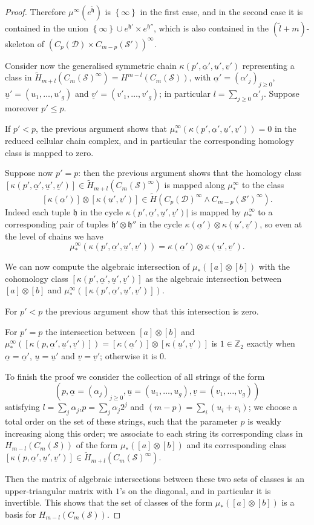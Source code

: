 \documentclass{amsart}
\theoremstyle{plain}
\theoremstyle{definition}
\newcommand{\D}{\mathcal{D}}
\renewcommand{\S}{\mathcal{S}}
\newcommand{\Z}{\mathbb{Z}}
\newcommand{\cms}{C_m(\S)}
\newcommand{\tup}{\mathfrak{h}}
\newcommand{\tH}{\tilde{H}}
\newcommand{\pa}[1]{\left(#1\right)}
\newcommand{\set}[1]{\left\{#1\right\}}
\newcommand{\uu}{\underline{u}}
\newcommand{\uv}{\underline{v}}
\newcommand{\ualpha}{\underline{\alpha}}
\begin{document}
\begin{proof}
Therefore
$\mu^{\infty}(e^{\tilde{\tup}})$ is $\set{\infty}$ in the first case, and in the second case it
is contained in the union $\set{\infty}\cup e^{\tup'}\times e^{\tup''}$, which is also
contained in the $(\tilde{l}+m)$-skeleton of $\pa{C_p(\D)\times C_{m-p}(\S')}^{\infty}$.

Consider now the generalised symmetric chain $\kappa(p',\ualpha',\uu',\uv')$ representing
a class in $\tH_{m+l}(\cms^{\infty})=H^{m-l}(\cms)$, with $\ualpha'=(\alpha'_j)_{j\geq 0}$,
$\uu'=(u_1,\dots,u'_g)$ and $\uv'=(v'_1,\dots,v'_g)$; in particular $l=\sum_{j\geq 0}\alpha'_j$.
Suppose moreover $p'\leq p$.

If $p'<p$, the previous argument shows that $\mu^{\infty}_*\pa{\kappa(p',\ualpha',\uu',\uv')}=0$
in the reduced cellular chain complex,
and in particular the corresponding homology class is mapped to zero.

Suppose now $p'=p$: then the previous argument shows that
the homology class $[\kappa(p',\ualpha',\uu',\uv')]\in \tH_{m+l}(\cms^{\infty})$
is mapped along $\mu^{\infty}_*$ to the class
\[
[\kappa(\ualpha')]\otimes [\kappa(\uu',\uv')]\in\tH\pa{C_p(\D)^{\infty}\wedge C_{m-p}(\S')^{\infty}}.
\]
Indeed each tuple $\tup$ in the cycle $\kappa(p',\ualpha',\uu',\uv')|$ is mapped by $\mu^{\infty}_*$
to a corresponding pair of tuples $\tup'\otimes\tup''$ in the cycle $\kappa(\ualpha')\otimes \kappa(\uu',\uv')$,
so even at the level of chains we have
\[
\mu^{\infty}_*\pa{\kappa(p',\ualpha',\uu',\uv')}=\kappa(\ualpha')\otimes \kappa(\uu',\uv').
\]

We can now compute the algebraic intersection of $\mu_*([a]\otimes [b])$ with
the cohomology class $[\kappa(p',\ualpha',\uu',\uv')]$ as the algebraic intersection between
$[a]\otimes [b]$ and $\mu^{\infty}_*\pa{[\kappa(p',\ualpha',\uu',\uv')]}$.

For $p'<p$ the previous argument show that this intersection is zero.

For $p'=p$ the intersection between
$[a]\otimes [b]$ and $\mu^{\infty}_*([\kappa(p,\ualpha',\uu',\uv')])=[\kappa(\ualpha')]\otimes [\kappa(\uu',\uv')]$
is $1\in\Z_2$ exactly when $\ualpha=\ualpha'$, $\uu=\uu'$ and $\uv=\uv'$; otherwise it is $0$.

To finish the proof we consider the collection of all strings of the form
\[
\pa{p,\ualpha=(\alpha_j)_{j\geq 0},\uu=(u_1,\dots,u_g),\uv=(v_1,\dots,v_g)}
\]
satisfying $l=\sum_j\alpha_j$,$p=\sum_j \alpha_j2^j$ and $(m-p)=\sum_i(u_i+v_i)$;
we choose a total order on the set of these strings,
such that the parameter $p$ is weakly increasing along this order; we associate
to each string its corresponding class in $H_{m-l}(\cms)$ of the form $\mu_*([a]\otimes [b])$ and its
corresponding class $[\kappa(p,\ualpha',\uu',\uv')]\in\tH_{m+l}(\cms^{\infty})$.

Then the matrix of algebraic intersections between these two sets of
classes is an upper-triangular matrix
with $1$'s on the diagonal, and in particular
it is invertible. This shows that the set of classes of the form $\mu_*([a]\otimes [b])$
is a basis for $H_{m-l}(\cms)$.
\end{proof}
\end{document}
